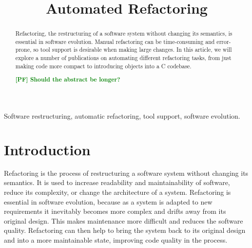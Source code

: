 \documentclass[conference,compsoc,a4paper]{IEEEtran}
\newcommand{\pf}[1]{\textcolor{green}{\textbf{[PF] #1}}}
\begin{document}
\title{Automated Refactoring}
\author{
  \and
}

\maketitle


\begin{abstract}
Refactoring, the restructuring of a software system without changing its semantics, is essential in software evolution. 
Manual refactoring can be time-consuming and error-prone, so tool support is desirable when making large changes. In 
this article, we will explore a number of publications on automating different refactoring tasks, from just making code 
more compact to introducing objects into a C codebase.

\pf{Should the abstract be longer?}
\end{abstract}

\begin{IEEEkeywords}
Software restructuring, automatic refactoring, tool support, software evolution.
\end{IEEEkeywords}

%
\IEEEpeerreviewmaketitle


\section{Introduction}

Refactoring is the process of restructuring a software system without changing its semantics. It is used to increase 
readability and maintainability of software, reduce its complexity, or change the architecture of a system. Refactoring 
is essential in software evolution, because as a system is adapted to new requirements it inevitably becomes more 
complex and drifts away from its original design. This makes maintenance more difficult and reduces the software 
quality. Refactoring can then help to bring the system back to its original design and into a more maintainable state, 
improving code quality in the process.
\end{document}
